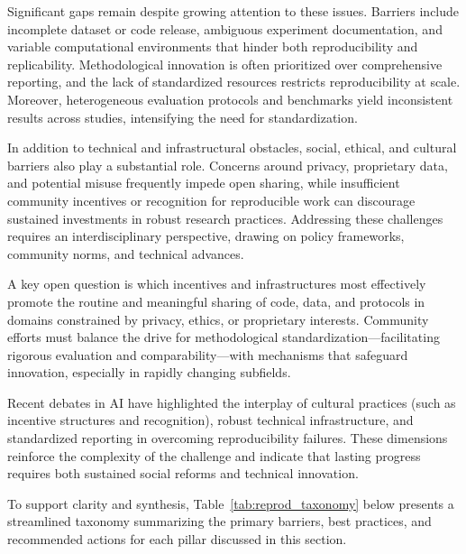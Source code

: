 \documentclass[sigconf]{acmart}
\begin{document}
Significant gaps remain despite growing attention to these issues. Barriers include incomplete dataset or code release, ambiguous experiment documentation, and variable computational environments that hinder both reproducibility and replicability. Methodological innovation is often prioritized over comprehensive reporting, and the lack of standardized resources restricts reproducibility at scale. Moreover, heterogeneous evaluation protocols and benchmarks yield inconsistent results across studies, intensifying the need for standardization.

In addition to technical and infrastructural obstacles, social, ethical, and cultural barriers also play a substantial role. Concerns around privacy, proprietary data, and potential misuse frequently impede open sharing, while insufficient community incentives or recognition for reproducible work can discourage sustained investments in robust research practices. Addressing these challenges requires an interdisciplinary perspective, drawing on policy frameworks, community norms, and technical advances.

A key open question is which incentives and infrastructures most effectively promote the routine and meaningful sharing of code, data, and protocols in domains constrained by privacy, ethics, or proprietary interests. Community efforts must balance the drive for methodological standardization—facilitating rigorous evaluation and comparability—with mechanisms that safeguard innovation, especially in rapidly changing subfields.

Recent debates in AI have highlighted the interplay of cultural practices (such as incentive structures and recognition), robust technical infrastructure, and standardized reporting in overcoming reproducibility failures. These dimensions reinforce the complexity of the challenge and indicate that lasting progress requires both sustained social reforms and technical innovation.

To support clarity and synthesis, Table~\ref{tab:reprod_taxonomy} below presents a streamlined taxonomy summarizing the primary barriers, best practices, and recommended actions for each pillar discussed in this section.
\end{document}
